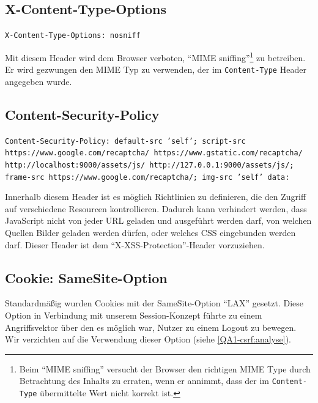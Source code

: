 \documentclass[12pt,DIV14,BCOR10mm,a4paper,parskip=half-,headsepline,headinclude,english,ngerman,bibliography=totocnumbered]{scrreprt}
\begin{document}
\subsection{X-Content-Type-Options}
\begin{sloppypar}
\texttt{X-Content-Type-Options: nosniff}
\end{sloppypar}
Mit diesem Header wird dem Browser verboten, \enquote{MIME sniffing}\footnote{Beim \enquote{MIME sniffing} versucht der Browser den richtigen MIME Type durch Betrachtung des Inhalts zu erraten, wenn er annimmt, dass der im \texttt{Content-Type} übermittelte Wert nicht korrekt ist.} zu betreiben. Er wird gezwungen den MIME Typ zu verwenden, der im \texttt{Content-Type} Header angegeben wurde.

\subsection{Content-Security-Policy}
\begin{sloppypar}
\texttt{Content-Security-Policy: default-src 'self'; script-src https://www.google.com/recaptcha/ https://www.gstatic.com/recaptcha/ http://localhost:9000/assets/js/ http://127.0.0.1:9000/assets/js/; frame-src https://www.google.com/recaptcha/; img-src 'self' data:}
\end{sloppypar}
Innerhalb diesem Header ist es möglich Richtlinien zu definieren, die den Zugriff auf verschiedene Resourcen kontrollieren.
Dadurch kann verhindert werden, dass JavaScript nicht von jeder URL geladen und ausgeführt werden darf, von welchen Quellen Bilder geladen werden dürfen, oder welches CSS eingebunden werden darf.
Dieser Header ist dem \enquote{X-XSS-Protection}-Header vorzuziehen.


\subsection{Cookie: SameSite-Option}
Standardmäßig wurden Cookies mit der SameSite-Option \enquote{LAX} gesetzt. Diese Option in Verbindung mit unserem Session-Konzept führte zu einem Angriffsvektor über den es möglich war, Nutzer zu einem Logout zu bewegen. Wir verzichten auf die Verwendung dieser Option (siehe \ref{QA1-csrf:analyse}).

\end{document}
